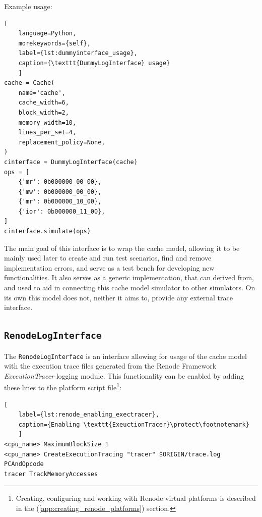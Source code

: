 \noindent Example usage:

\begin{center}
\centering
\begin{minipage}{\linewidth}
\begin{lstlisting}[
    language=Python,
	morekeywords={self},
    label={lst:dummyinterface_usage},
    caption={\texttt{DummyLogInterface} usage}
    ]
cache = Cache(
    name='cache',
    cache_width=6,
    block_width=2,
    memory_width=10,
    lines_per_set=4,
    replacement_policy=None,
)
cinterface = DummyLogInterface(cache)
ops = [
    {'mr': 0b000000_00_00},
    {'mw': 0b000000_00_00},
    {'mr': 0b000000_10_00},
    {'ior': 0b000000_11_00},    
]
cinterface.simulate(ops)
\end{lstlisting}
\end{minipage}
\end{center}

\noindent The main goal of this interface is to wrap the cache model, allowing it to be mainly used later to create and run test scenarios, find and remove implementation errors, and
serve as a test bench for developing new functionalities. It also serves as a generic implementation, that can derived from, and used to aid in connecting this cache model simulator
to other simulators. On its own this model does not, neither it aims to, provide any external trace interface.

\subsection{\texttt{RenodeLogInterface}}

The \texttt{RenodeLogInterface} is an interface allowing for usage of the cache model with the execution trace files generated from the Renode Framework \textit{ExecutionTracer} logging module.
This functionality can be enabled by adding these lines to the platform script file\footnote{Creating, configuring and working with Renode virtual platforms is described in the
(\ref{app:creating_renode_platforms}) section.}:

\begin{center}
\centering
\begin{minipage}{\linewidth}
\begin{lstlisting}[
    label={lst:renode_enabling_exectracer},
    caption={Enabling \texttt{ExeuctionTracer}\protect\footnotemark}
    ]
<cpu_name> MaximumBlockSize 1
<cpu_name> CreateExecutionTracing "tracer" $ORIGIN/trace.log PCAndOpcode
tracer TrackMemoryAccesses
\end{lstlisting}
\end{minipage}
\end{center}


